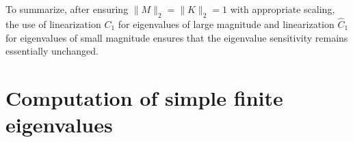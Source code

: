\documentclass[12pt]{article}
\begin{document}
To summarize, after ensuring $\|M\|_2 = \|K\|_2 = 1$ with appropriate scaling, the use of linearization $C_1$ for eigenvalues of large magnitude and 
linearization $\hat C_1$ for eigenvalues of small magnitude ensures that the eigenvalue sensitivity remains essentially unchanged.



\section{Computation of simple finite eigenvalues}




\end{document}
